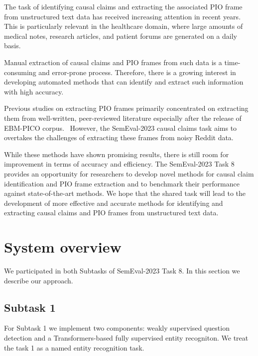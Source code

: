 \documentclass[11pt]{article}
\begin{document}
The task of identifying causal claims and extracting the associated PIO frame from unstructured text data has received increasing attention in recent years. This is particularly relevant in the healthcare domain, where large amounts of medical notes, research articles, and patient forums are generated on a daily basis.

Manual extraction of causal claims and PIO frames from such data is a time-consuming and error-prone process. Therefore, there is a growing interest in developing automated methods that can identify and extract such information with high accuracy.

Previous studies on extracting PIO frames primarily concentrated on extracting them from well-written, peer-reviewed literature especially after the release of EBM-PICO corpus.~\cite{nye2018corpus}
However, the SemEval-2023 causal claims task aims to overtakes the challenges of extracting these frames from noisy Reddit data.~\cite{brockmeier2019improving,dhrangadhariya2021end}

While these methods have shown promising results, there is still room for improvement in terms of accuracy and efficiency. The SemEval-2023 Task 8 provides an opportunity for researchers to develop novel methods for causal claim identification and PIO frame extraction and to benchmark their performance against state-of-the-art methods. We hope that the shared task will lead to the development of more effective and accurate methods for identifying and extracting causal claims and PIO frames from unstructured text data.





\section{System overview}

We participated in both Subtasks of SemEval-2023 Task 8. 
In this section we describe our approach.

\subsection{Subtask 1} \label{sec:system1}



For Subtask 1 we implement two components: weakly supervised question detection and a Transformers-based fully supervised entity recogniton.
We treat the task 1 as a named entity recognition task.
\end{document}

